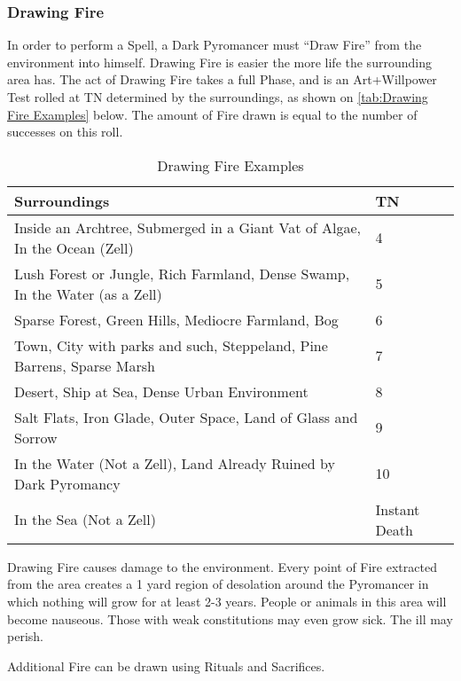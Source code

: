 \documentclass[oneside,11pt,english]{book}
\begin{document}
\subsubsection{Drawing Fire}
In order to perform a Spell, a Dark Pyromancer must “Draw Fire” from the
environment into himself. Drawing Fire is easier the more life the surrounding
area has. The act of Drawing Fire takes a full Phase, and is an Art+Willpower
Test rolled at TN determined by the surroundings, as shown on
\autoref{tab:Drawing Fire Examples} below. The amount of Fire drawn is equal to
the number of successes on this roll.
\begin{table}[ht]
  \centering
  \caption{Drawing Fire Examples}
  \label{tab:Drawing Fire Examples}
  \begin{tabu} spread 0pt {XX[-1]}
    Surroundings                                                                 & TN            \\\toprule
    Inside an Archtree, Submerged in a Giant  Vat of Algae, In the Ocean (Zell)  & 4             \\
    Lush Forest or Jungle, Rich Farmland,  Dense Swamp, In the Water (as a Zell) & 5             \\
    Sparse Forest, Green Hills, Mediocre  Farmland, Bog                          & 6             \\
    Town, City with parks and such, Steppeland,  Pine Barrens, Sparse Marsh      & 7             \\
    Desert, Ship at Sea, Dense Urban  Environment                                & 8             \\
    Salt Flats, Iron Glade, Outer Space, Land  of Glass and Sorrow               & 9             \\
    In the Water (Not a Zell), Land Already Ruined by Dark Pyromancy             & 10            \\
    In the Sea (Not a Zell)                                                      & Instant Death \\
  \end{tabu}
\end{table}
Drawing Fire causes damage to the environment. Every point of Fire extracted
from the area creates a 1 yard region of desolation around the Pyromancer in
which nothing will grow for at least 2-3 years. People or animals in this area
will become nauseous. Those with weak constitutions may even grow sick. The ill
may perish.

Additional Fire can be drawn using Rituals and Sacrifices. 
\end{document}

